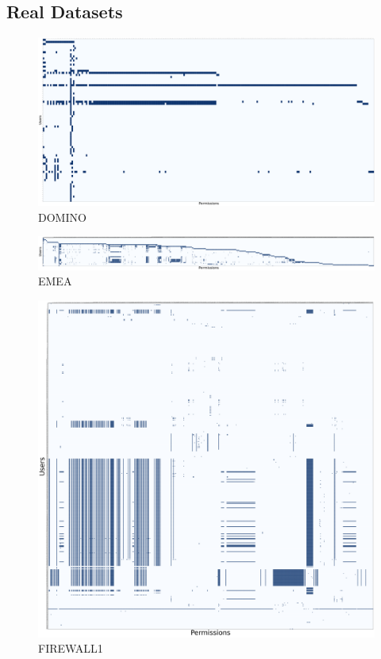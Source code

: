 \subsection{Real Datasets}
\label{sec:visualRealDatasets}
\begin{figure}[H]
	\centering
	\includegraphics[scale=0.048]{./Figures/domino}
	\caption{DOMINO}
	\label{fig:domino}
\end{figure}
\begin{figure}[H]
	\centering
	\includegraphics[scale=0.05]{./Figures/emea}
	\caption{EMEA}
	\label{fig:emea}
\end{figure}
\begin{figure}[H]
	\centering
	\includegraphics[scale=0.1]{./Figures/firewall1}
	\caption{FIREWALL1}
	\label{fig:firewall1}
\end{figure}
